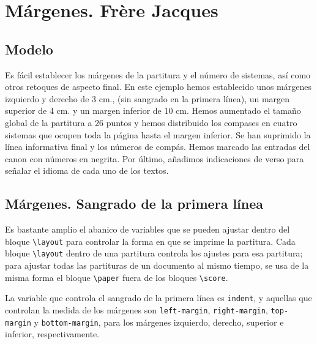 \section{Márgenes. Frère Jacques}


\subsection{Modelo}

Es fácil establecer los márgenes de la partitura y el número de
sistemas, así como otros retoques de aspecto final. En este ejemplo
hemos establecido unos márgenes izquierdo y derecho de 3 cm., (sin
sangrado en la primera línea), un margen superior de 4 cm. y un margen
inferior de 10 cm.  Hemos aumentado el tamaño global de la partitura a
26 puntos y hemos distribuido los compases en cuatro sistemas que
ocupen toda la página hasta el margen inferior.  Se han suprimido la
línea informativa final y los números de compás.  Hemos marcado las
entradas del canon con números en negrita.  Por último, añadimos
indicaciones de verso para señalar el idioma de cada uno de los
textos.

\bigskip
\begin{center}
\end{center}
\bigskip



\subsection{Márgenes.  Sangrado de la primera línea}

Es bastante amplio el abanico de variables que se pueden ajustar
dentro del bloque \verb+\layout+ para controlar la forma en que se
imprime la partitura.  Cada bloque \verb+\layout+ dentro de una
partitura controla los ajustes para esa partitura; para ajustar todas
las partituras de un documento al mismo tiempo, se usa de la misma
forma el bloque \verb+\paper+ fuera de los bloques \verb+\score+.

La variable que controla el sangrado de la primera línea es
\verb+indent+, y aquellas que controlan la medida de los márgenes son
\verb+left-margin+, \verb+right-margin+, \verb+top-margin+ y
\verb+bottom-margin+, para los márgenes izquierdo, derecho, superior e
inferior, respectivamente.

